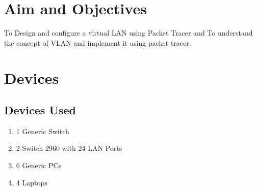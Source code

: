 \documentclass[11pt]{article}
\begin{document}
\tableofcontents
\thispagestyle{empty}
\clearpage


\setcounter{page}{1}

\section{Aim and Objectives}
To Design and configure a virtual LAN using Packet Tracer and To understand the concept of VLAN and implement it using packet tracer.

\section{Devices}

\subsection{Devices Used}
\begin{enumerate}
	\item 1 Generic Switch
	\item 2 Switch 2960 with 24 LAN Ports
	\item 6 Generic PCs
	\item 4 Laptops
\end{enumerate}
\end{document}
